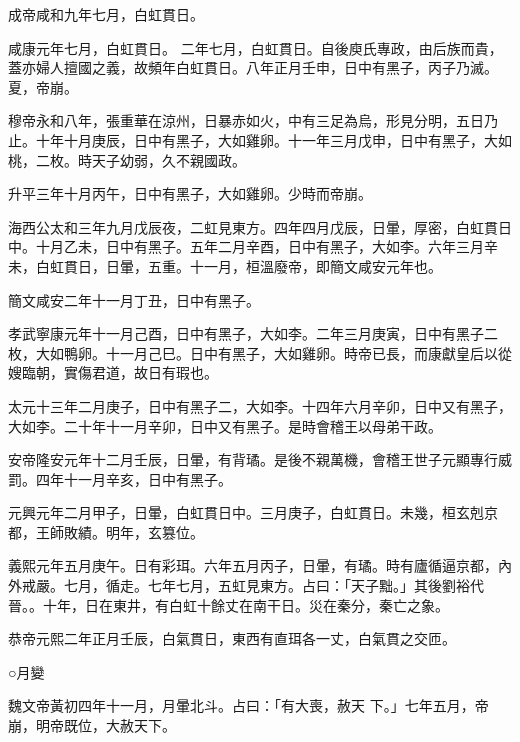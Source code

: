 \begin{pinyinscope}
 成帝咸和九年七月，白虹貫日。



 咸康元年七月，白虹貫日。
 二年七月，白虹貫日。自後庾氏專政，由后族而貴，蓋亦婦人擅國之義，故頻年白虹貫日。八年正月壬申，日中有黑子，丙子乃滅。夏，帝崩。



 穆帝永和八年，張重華在涼州，日暴赤如火，中有三足為烏，形見分明，五日乃止。十年十月庚辰，日中有黑子，大如雞卵。十一年三月戊申，日中有黑子，大如桃，二枚。時天子幼弱，久不親國政。



 升平三年十月丙午，日中有黑子，大如雞卵。少時而帝崩。



 海西公太和三年九月戊辰夜，二虹見東方。四年四月戊辰，日暈，厚密，白虹貫日中。十月乙未，日中有黑子。五年二月辛酉，日中有黑子，大如李。六年三月辛未，白虹貫日，日暈，五重。十一月，桓溫廢帝，即簡文咸安元年也。



 簡文咸安二年十一月丁丑，日中有黑子。



 孝武寧康元年十一月己酉，日中有黑子，大如李。二年三月庚寅，日中有黑子二枚，大如鴨卵。十一月己巳。日中有黑子，大如雞卵。時帝已長，而康獻皇后以從
 嫂臨朝，實傷君道，故日有瑕也。



 太元十三年二月庚子，日中有黑子二，大如李。十四年六月辛卯，日中又有黑子，大如李。二十年十一月辛卯，日中又有黑子。是時會稽王以母弟干政。



 安帝隆安元年十二月壬辰，日暈，有背璚。是後不親萬機，會稽王世子元顯專行威罰。四年十一月辛亥，日中有黑子。



 元興元年二月甲子，日暈，白虹貫日中。三月庚子，白虹貫日。未幾，桓玄剋京都，王師敗績。明年，玄篡位。



 義熙元年五月庚午。日有彩珥。六年五月丙子，日暈，有璚。時有廬循逼京都，內外戒嚴。七月，循走。七年七月，五虹見東方。占曰：「天子黜。」其後劉裕代晉。。十年，日在東井，有白虹十餘丈在南干日。災在秦分，秦亡之象。



 恭帝元熙二年正月壬辰，白氣貫日，東西有直珥各一丈，白氣貫之交匝。



 ○月變



 魏文帝黃初四年十一月，月暈北斗。占曰：「有大喪，赦天
 下。」七年五月，帝崩，明帝既位，大赦天下。




\end{pinyinscope}

